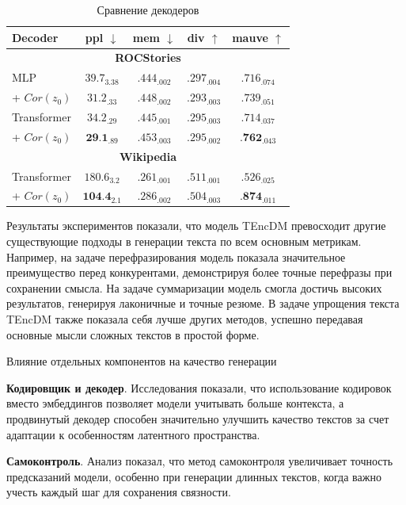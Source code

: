 \documentclass[a4paper, 12pt]{article}
\begin{document}
\begin{table}
\centering
\begin{tabular}{l|cccc}
\hline
\textbf{Decoder} & \textbf{ppl} $\downarrow$ & \textbf{mem} $\downarrow$ & \textbf{div} $\uparrow$ & \textbf{mauve} $\uparrow$ \\
\hline
\multicolumn{5}{c}{\textbf{ROCStories}} \\
\hline
MLP & $39.7_{3.38}$ & $.444_{.002}$ & $.297_{.004}$ & $.716_{.074}$ \\
\; + $Cor(z_0)$ & $31.2_{.33}$ & $.448_{.002}$ & $.293_{.003}$ & $.739_{.051}$ \\
Transformer & $34.2_{.29}$ & $.445_{.001}$ & $.295_{.003}$ & $.714_{.037}$ \\
\; + $Cor(z_0)$ & $\textbf{29.1}_{.89}$ & ${.453}_{.003}$ & ${.295}_{.002}$ & $\textbf{.762}_{.043}$ \\
\hline
\multicolumn{5}{c}{\textbf{Wikipedia}} \\
\hline
Transformer & $180.6_{3.2}$ & $.261_{.001}$ & $.511_{.001}$ & $.526_{.025}$ \\
\; + $Cor(z_0)$ & $\textbf{104.4}_{2.1}$ & $.286_{.002}$ & $.504_{.003}$ & $\textbf{.874}_{.011}$ \\
\hline
\end{tabular}
\caption{Сравнение декодеров}
\label{tab::decoders}
\end{table}

Результаты экспериментов показали, что модель TEncDM превосходит другие существующие подходы в генерации текста по всем основным метрикам. Например, на задаче перефразирования модель показала значительное преимущество перед конкурентами, демонстрируя более точные перефразы при сохранении смысла. На задаче суммаризации модель смогла достичь высоких результатов, генерируя лаконичные и точные резюме. В задаче упрощения текста TEncDM также показала себя лучше других методов, успешно передавая основные мысли сложных текстов в простой форме.

Влияние отдельных компонентов на качество генерации

\textbf{Кодировщик и декодер}. Исследования показали, что использование кодировок вместо эмбеддингов позволяет модели учитывать больше контекста, а продвинутый декодер способен значительно улучшить качество текстов за счет адаптации к особенностям латентного пространства.

\textbf{Самоконтроль}. Анализ показал, что метод самоконтроля увеличивает точность предсказаний модели, особенно при генерации длинных текстов, когда важно учесть каждый шаг для сохранения связности.
\end{document}

